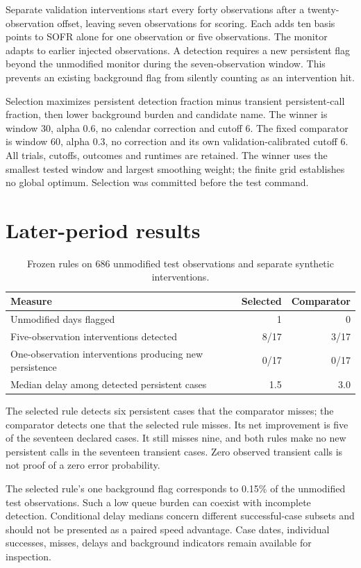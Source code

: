 \documentclass[11pt]{article}
\begin{document}
Separate validation interventions start every forty observations after a twenty-observation offset, leaving seven observations for scoring. Each adds ten basis points to SOFR alone for one observation or five observations. The monitor adapts to earlier injected observations. A detection requires a new persistent flag beyond the unmodified monitor during the seven-observation window. This prevents an existing background flag from silently counting as an intervention hit.

Selection maximizes persistent detection fraction minus transient persistent-call fraction, then lower background burden and candidate name. The winner is window 30, alpha 0.6, no calendar correction and cutoff 6. The fixed comparator is window 60, alpha 0.3, no correction and its own validation-calibrated cutoff 6. All trials, cutoffs, outcomes and runtimes are retained. The winner uses the smallest tested window and largest smoothing weight; the finite grid establishes no global optimum. Selection was committed before the test command.

\section{Later-period results}
\begin{table}[ht]\centering
\caption{Frozen rules on 686 unmodified test observations and separate synthetic interventions.}
\begin{tabular}{lrr}\toprule
Measure & Selected & Comparator\\\midrule
Unmodified days flagged & 1 & 0\\
Five-observation interventions detected & 8/17 & 3/17\\
One-observation interventions producing new persistence & 0/17 & 0/17\\
Median delay among detected persistent cases & 1.5 & 3.0\\\bottomrule
\end{tabular}\end{table}

The selected rule detects six persistent cases that the comparator misses; the comparator detects one that the selected rule misses. Its net improvement is five of the seventeen declared cases. It still misses nine, and both rules make no new persistent calls in the seventeen transient cases. Zero observed transient calls is not proof of a zero error probability.

The selected rule's one background flag corresponds to 0.15\% of the unmodified test observations. Such a low queue burden can coexist with incomplete detection. Conditional delay medians concern different successful-case subsets and should not be presented as a paired speed advantage. Case dates, individual successes, misses, delays and background indicators remain available for inspection.
\end{document}
